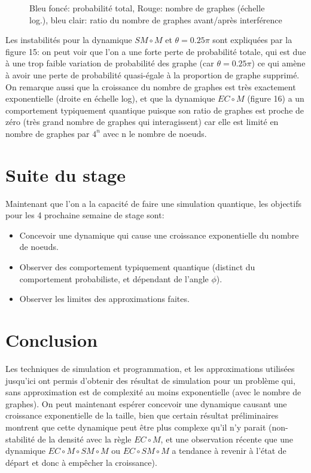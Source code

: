 \documentclass[11pts,french]{article}
\begin{document}
\begin{figure}[h!]
\captionsetup{labelformat=empty}
\caption{Bleu foncé: probabilité total, Rouge: nombre de graphes (échelle log.), bleu clair: ratio du nombre de graphes avant/après interférence }

\end{figure}

Les instabilités pour la dynamique $SM \circ M$ et $\theta=0.25\pi$ sont expliquées par la figure 15: on peut voir que l'on a une forte perte de probabilité totale, qui est due à une trop faible variation de probabilité des graphe (car $\theta=0.25\pi$) ce qui amène à avoir une perte de probabilité quasi-égale à la proportion de graphe supprimé. \\

On remarque aussi que la croissance du nombre de graphes est très exactement exponentielle (droite en échelle log), et que la dynamique $EC \circ M$ (figure 16) a un comportement typiquement quantique puisque son ratio de graphes est proche de zéro (très grand nombre de graphes qui interagissent) car elle est limité en nombre de graphes par $4^n$ avec n le nombre de noeuds.

\section{ Suite du stage }

Maintenant que l'on a la capacité de faire une simulation quantique, les objectifs pour les 4 prochaine semaine de stage sont:

\begin{itemize}
\itemsep0em
    \item Concevoir une dynamique qui cause une croissance exponentielle du nombre de noeuds.
    \item Observer des comportement typiquement quantique (distinct du comportement probabiliste, et dépendant de l'angle $\phi$).
    \item Observer les limites des approximations faites.
\end{itemize}

\pagebreak{}

\section{ Conclusion }

Les techniques de simulation et programmation, et les approximations utilisées jusqu'ici ont permis d'obtenir des résultat de simulation pour un problème qui, sans approximation est de complexité au moins exponentielle (avec le nombre de graphes). On peut maintenant espérer concevoir une dynamique causant une croissance exponentielle de la taille, bien que certain résultat préliminaires montrent que cette dynamique peut être plus complexe qu'il n'y parait (non-stabilité de la densité avec la règle $EC \circ M$, et une observation récente que une dynamique $EC \circ M \circ SM \circ M$ ou $EC \circ SM \circ M$ a tendance à revenir à l'état de départ et donc à empêcher la croissance). \\
\end{document}
